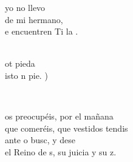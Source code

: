 \documentclass[12pt]{article}
\begin{document}
\begin{multicols*}{2}
\begin{cancion}
	 yo no llevo\\
	 de mi hermano,\\
	e encuentren Ti la .  \\\jump\\
	\begin{chorus}%
	ot pieda\\
	isto n pie. )\\
	\end{chorus}%
	\jump\\
\end{cancion}%

\begin{cancion}[No os preocupéis][]%
	 os preocupéis, por el mañana\\
	que comeréis, que vestidos tendis \\
	ante o busc, y dese\\
	el Reino de s, su juicia y su z.\\
\end{cancion}%


\end{multicols*}
\end{document}
